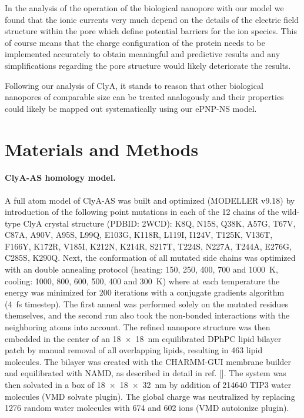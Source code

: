 \documentclass[journal=ancac3,manuscript=article,etalmode=truncate,maxauthors=0,layout=onecolumn]{achemso}
\begin{document}
In the analysis of the operation of the biological nanopore with our model we found that the ionic currents
very much depend on the details of the electric field structure within the pore which define potential
barriers for the ion species. This of course means that the charge configuration of the protein needs to be
implemented accurately to obtain meaningful and predictive results and any simplifications regarding the pore
structure would likely deteriorate the results.

Following our analysis of ClyA, it stands to reason that other biological nanopores of comparable size can be
treated analogously and their properties could likely be mapped out systematically using our ePNP-NS model.


\section{Materials and Methods}\label{sec:methods}

\paragraph{ClyA-AS homology model.}
%
A full atom model of ClyA-AS\cite{Soskine-2013} was built and optimized (MODELLER v9.18\cite{Sali-1993}) by
introduction of the following point mutations in each of the 12 chains of the wild-type ClyA crystal structure
(PDBID: 2WCD\cite{Mueller-2009}): K8Q, N15S, Q38K, A57G, T67V, C87A, A90V, A95S, L99Q, E103G, K118R, L119I,
I124V, T125K, V136T, F166Y, K172R, V185I, K212N, K214R, S217T, T224S, N227A, T244A, E276G, C285S, K290Q. Next,
the conformation of all mutated side chains was optimized with an double annealing protocol (heating: 150,
250, 400, 700 and \SI{1000}{\kelvin}, cooling: 1000, 800, 600, 500, 400 and \SI{300}{\kelvin}) where at each
temperature the energy was minimized for 200 iterations with a conjugate gradients algorithm (\SI{4}{\fs}
timestep).\cite{Shanno-1980} The first anneal was performed solely on the mutated residues themselves, and
the second run also took the non-bonded interactions with the neighboring atoms into account. The refined
nanopore structure was then embedded in the center of an \SI{18x18}{\nm} equilibrated DPhPC lipid bilayer
patch by manual removal of all overlapping lipids, resulting in 463 lipid molecules. The bilayer was created
with the CHARMM-GUI\cite{Jo-2008} membrane builder\cite{Lee-2016} and equilibrated with
NAMD\cite{Phillips-2005}, as described in detail in ref. []. The system was then solvated in
a box of \SI{18x18x32}{\nm} by addition of 214640 TIP3 water molecules (VMD solvate plugin). The global charge
was neutralized by replacing 1276 random water molecules with 674 \Na{} and 602 \Cl{} ions (VMD autoionize
plugin).\cite{Humphrey-1996}
\end{document}

